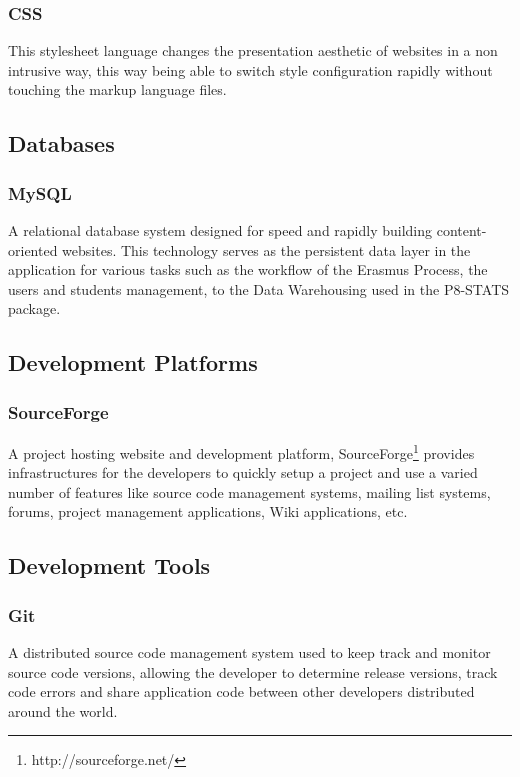 \subsubsection{CSS}

This stylesheet language changes the presentation aesthetic of websites in a non
intrusive way, this way being able to switch style configuration rapidly without
touching the markup language files.

\subsection{Databases}

\subsubsection{MySQL}

A relational database system designed for speed and rapidly building
content-oriented websites. This technology serves as the persistent data layer
in the application for various tasks such as the workflow of the Erasmus
Process, the users and students management, to the Data Warehousing used in the
P8-STATS package.

\subsection{Development Platforms}

\subsubsection{SourceForge}

A project hosting website and development platform,
SourceForge\footnote{http://sourceforge.net/} provides infrastructures for the developers to quickly setup a project and use a varied number of features like
source code management systems, mailing list systems, forums, project management
applications, Wiki applications, etc.

\subsection{Development Tools}

\subsubsection{Git}

A distributed source code management system used to keep track and monitor
source code versions, allowing the developer to determine release versions,
track code errors and share application code between other developers
distributed around the world.

